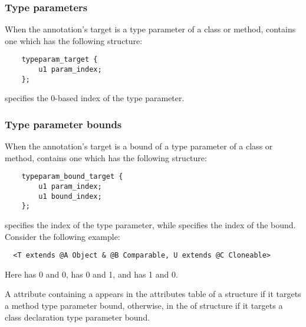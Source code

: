 \documentclass[10pt]{article}
\begin{document}
\subsubsection{Type parameters\label{class-file:ext:ri:mtp}}

When the annotation's target is a type parameter of a class or method,
 contains one  which has the
following structure:

\begin{Verbatim}
    typeparam_target {
        u1 param_index;
    };
\end{Verbatim}

 specifies the 0-based index of the type parameter.



\subsubsection{Type parameter bounds\label{class-file:ext:ri:tpbound}}

When the annotation's target is a bound of a type parameter of a class or
method,  contains one 
which has the following structure:

\begin{Verbatim}
    typeparam_bound_target {
        u1 param_index;
        u1 bound_index;
    };
\end{Verbatim}

 specifies the index of the type parameter, while
 specifies the index of the bound.  Consider the following
example:

\begin{Verbatim}
  <T extends @A Object & @B Comparable, U extends @C Cloneable>
\end{Verbatim}

\noindent
Here
 has  0 and  0,
 has  0 and  1, and
 has  1 and  0.

A \RuntimeInOrVisibleTypeAnnotations attribute containing a
 appears in the attributes table of a
 structure if it targets a method type parameter bound,
otherwise, in the  of  structure if it
targets a class declaration type parameter bound.
\end{document}
